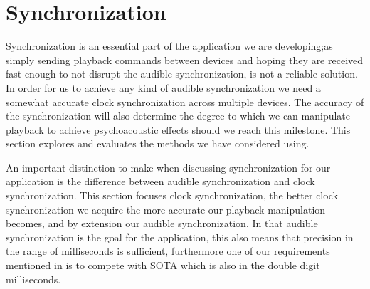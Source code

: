 \section{Synchronization}
Synchronization is an essential part of the application we are developing;as simply sending playback commands between devices and hoping they are received fast enough to not disrupt the audible synchronization, is not a reliable solution.
In order for us to achieve any kind of audible synchronization we need a somewhat accurate clock synchronization across multiple devices.
The accuracy of the synchronization will also determine the degree to which we can manipulate playback to achieve psychoacoustic effects should we reach this milestone.
This section explores and evaluates the methods we have considered using.

An important distinction to make when discussing synchronization for our application is the difference between audible synchronization and clock synchronization.
This section focuses clock synchronization, the better clock synchronization we acquire the more accurate our playback manipulation becomes, and by extension our audible synchronization.
In that audible synchronization is the goal for the application, this also means that precision in the range of milliseconds is sufficient, furthermore one of our requirements mentioned in  is to compete with \ac{SOTA} which is also in the double digit milliseconds.



